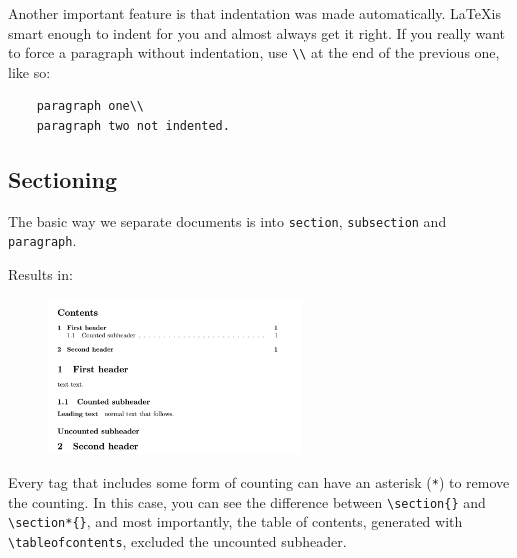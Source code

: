 Another important feature is that indentation was made automatically.
\LaTeX is smart enough to indent for you and almost always get it right.
If you really want to force a paragraph without indentation, use \verb|\\| at the end of the previous one, like so:
\begin{lstlisting}
    paragraph one\\
    paragraph two not indented.
\end{lstlisting}

\subsection{Sectioning}
The basic way we separate documents is into \verb|section|, \verb|subsection| and \verb|paragraph|.



Results in:
\begin{figure}[h]
    \centering
    \includegraphics[width=0.6\textwidth]{figures/sections.png}
    \label{fig:sections}
\end{figure}

Every tag that includes some form of counting can have an asterisk (\verb|*|) to remove the counting.
In this case, you can see the difference between \verb|\section{}| and \verb|\section*{}|, and most importantly, the table of contents, generated with \verb|\tableofcontents|, excluded the uncounted subheader.

